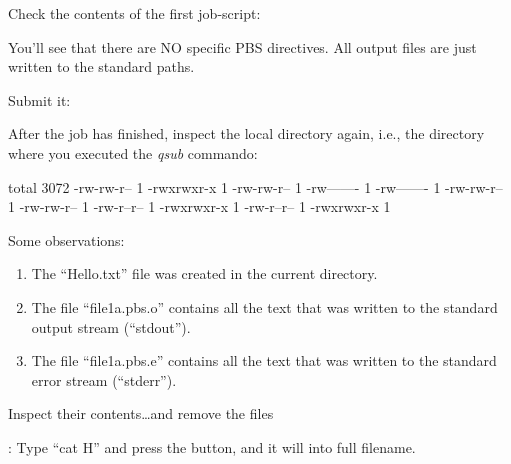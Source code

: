Check the contents of the first job-script:


You'll see that there are NO specific PBS directives.  All output files are
just written to the standard paths.

Submit it:
\begin{prompt}
\end{prompt}

After the job has finished, inspect the local directory again, i.e., the
directory where you executed the \emph{qsub} commando:

\begin{prompt}
total 3072
-rw-rw-r-- 1 %
-rwxrwxr-x 1 %
-rw-rw-r-- 1 %
-rw------- 1 %
-rw------- 1 %
-rw-rw-r-- 1 %
-rw-rw-r-- 1 %
-rw-r--r-- 1 %
-rwxrwxr-x 1 %
-rw-r--r-- 1 %
-rwxrwxr-x 1 %
\end{prompt}

Some observations:
\begin{enumerate}
\item The ``Hello.txt'' file was created in the current directory.
\item The file ``file1a.pbs.o\jobnumber'' contains all the text that was written to the standard output stream (``stdout'').
\item The file ``file1a.pbs.e\jobnumber'' contains all the text that was written to the standard error stream (``stderr'').
\end{enumerate}

Inspect their contents\dots and remove the files

\begin{prompt}
\end{prompt}

: Type ``cat H'' and press the  button, and it will
 into full filename.

